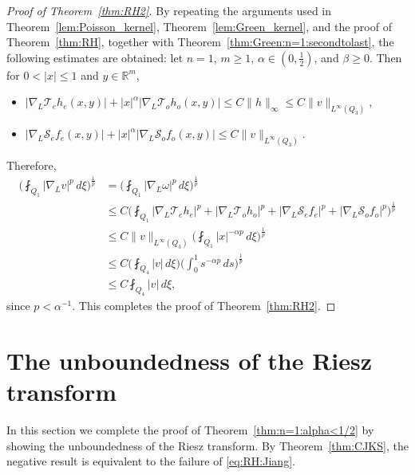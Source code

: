 \documentclass[12pt]{amsart}
\begin{document}
\begin{proof}[Proof of Theorem~\ref{thm:RH2}]
By repeating the arguments used in Theorem~\ref{lem:Poisson_kernel}, Theorem~\ref{lem:Green_kernel}, and the proof of Theorem~\ref{thm:RH}, together with Theorem~\ref{thm:Green:n=1:secondtolast}, the following estimates are obtained: let $n=1$, $m\ge 1$, $\alpha\in (0,\frac{1}{2})$, and $\beta \ge 0$. Then for $0<|x|\le 1$ and $y\in \mathbb{R}^m$,
\begin{itemize}
    \item $|\nabla_L \mathcal{T}_e h_e(x,y)| + |x|^{\alpha} |\nabla_L \mathcal{T}_o h_o(x,y)| \le C \|h\|_\infty \le C \|v\|_{L^\infty(Q_3)}$,
    \item $|\nabla_L \mathcal{S}_e f_e(x,y)| + |x|^{\alpha} |\nabla_L \mathcal{S}_o f_o(x,y)| \le C \|v\|_{L^\infty(Q_3)}$.
\end{itemize}
Therefore,
\begin{align*}
    \biggl( \fint_{Q_1} |\nabla_L v|^p \, d\xi \biggr)^{\!\frac{1}{p}}
    &= \biggl( \fint_{Q_1} |\nabla_L \omega|^p \, d\xi \biggr)^{\!\frac{1}{p}}\\
    &\le C\biggl( \fint_{Q_1} |\nabla_L \mathcal{T}_e h_e|^p + |\nabla_L \mathcal{T}_o h_o|^p + |\nabla_L \mathcal{S}_e f_e|^p + |\nabla_L \mathcal{S}_o f_o|^p \biggr)^{\!\frac{1}{p}}\\
    &\le C \|v\|_{L^\infty(Q_3)} \biggl( \fint_{Q_1} |x|^{-\alpha p} \, d\xi \biggr)^{\!\frac{1}{p}}\\
    &\le C \biggl(\fint_{Q_4} |v| \, d\xi \biggr) \biggl( \int_0^1 s^{-\alpha p} \, ds \biggr)^{\!\frac{1}{p}}\\
    &\le C \fint_{Q_4} |v| \, d\xi,
\end{align*}
since $p <\alpha^{-1}$. This completes the proof of Theorem~\ref{thm:RH2}.
\end{proof}










\section{The unboundedness of the Riesz transform}



In this section we complete the proof of Theorem~\ref{thm:n=1:alpha<1/2} by showing the unboundedness of the Riesz transform. By Theorem~\ref{thm:CJKS}, the negative result is equivalent to the failure of \eqref{eq:RH:Jiang}. 
\end{document}
